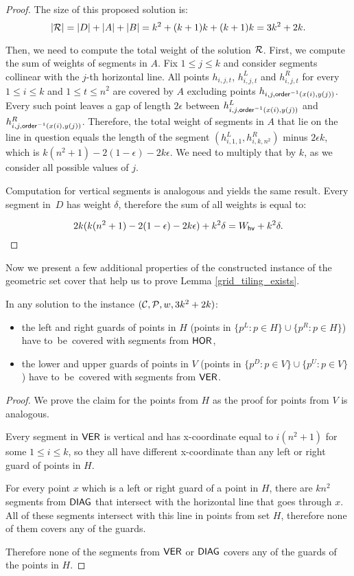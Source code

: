 \begin{proof}
The size of this proposed solution is:
$$|\mathcal{R}| = |D| + |A| + |B| = k^2 + (k+1)k + (k+1)k = 3k^2+2k.$$

Then, we need to compute the total weight of the solution $\mathcal{R}$.
First, we compute the sum of weights of segments in $A$.
Fix $1 \le j \le k$ and consider segments collinear
with the $j$-th horizontal line.
All points $h_{i,j,t}$, $h_{i,j,t}^L$ and $h_{i,j,t}^R$
for every $1 \le i \le k$ and $1 \le t \le n^2$ are covered by $A$
excluding points $h_{i,j,\mathsf{order}^{-1}(x(i),y(j))}$.
Every such point leaves a gap of length $2\epsilon$ between
$h_{i,j,\mathsf{order}^{-1}(x(i),y(j))}^L$ and $h_{i,j,\mathsf{order}^{-1}(x(i),y(j))}^R$.
Therefore, the total weight of segments in $A$
that lie on the line in question equals the length of the segment
$(h_{i,1,1}^L, h_{i,k,n^2}^R)$
minus $2\epsilon k$, which is $k(n^2+1) -2(1-\epsilon)-2k\epsilon$.
We need to multiply that by $k$, as we consider all possible values of $j$.

Computation for vertical segments is analogous and yields the same result.
Every segment in~$D$ has weight $\delta$, therefore the sum of all weights
is equal to:

$$2k(k(n^2+1) -2(1-\epsilon)-2k\epsilon) + k^2\delta= W_{\mathsf{hv}}+k^2\delta.\qedhere$$
\end{proof}

Now we present a few additional properties of the constructed instance
of the geometric set cover that help us to prove
Lemma \ref{grid_tiling_exists}.

\begin{claim}
\label{guards}
In any solution to the instance $(\mathcal{C}, \mathcal{P}, w, 3k^2+2k)$:
\begin{itemize}
\item the left and right guards of points in $H$
(points in $\{p^L : p \in H\} \cup \{p^R : p \in H\}$)
have to~be~covered with segments from $\mathsf{HOR}$,
\item the lower and upper guards of points in $V$
(points in $\{p^D : p \in V\} \cup \{p^U : p \in V\}$)
have to~be~covered with segments from $\mathsf{VER}$.
\end{itemize}
\end{claim}

\begin{proof}
We prove the claim for the points from $H$
as the proof for points from $V$ is analogous.

Every segment in $\mathsf{VER}$ is vertical and 
has x-coordinate equal to $i(n^2+1)$ for some $1\le i \le k$,
so they all have different x-coordinate
than any left or right guard of points in $H$.

For every point $x$ which is a left or right guard of a point in $H$,
there are $kn^2$ segments from $\mathsf{DIAG}$ that intersect with the horizontal
line that goes through $x$. All of these segments intersect with
this line in points from set $H$, therefore none of them
covers any of the guards.

Therefore none of the segments from $\mathsf{VER}$ or $\mathsf{DIAG}$ covers any
of the guards of the points in $H$.
\end{proof}

